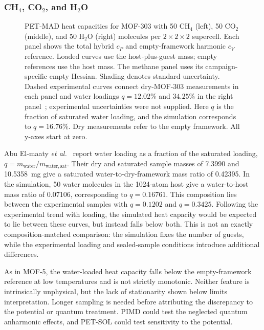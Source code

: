 \documentclass[12pt,a4paper]{article}
\numberwithin{equation}{section}
\begin{document}
\subsubsection{CH$_4$, CO$_2$, and H$_2$O}
\label{sec:mof303-guests-results}

\begin{figure}[htbp]
  \centering
  \mofthreethreetotals
  \caption{PET-MAD heat capacities for MOF-303 with 50 CH$_4$ (left),
  50 CO$_2$ (middle), and 50 H$_2$O (right) molecules per
  $2\times2\times2$ supercell. Each panel shows the total hybrid $c_P$
  and empty-framework harmonic $c_V$ reference. Loaded curves use the
  host-plus-guest mass; empty references use the host mass. The methane
  panel uses its campaign-specific empty Hessian. Shading denotes standard
  uncertainty. Dashed experimental curves connect dry-MOF-303 measurements
  in each panel and water loadings $q=12.02\%$ and $34.25\%$ in the right
  panel~\cite{abuelmaaty2025}; experimental uncertainties were not supplied.
  Here $q$ is the fraction of saturated water loading, and the simulation
  corresponds to $q=16.76\%$. Dry measurements refer to the empty framework.
  All y-axes start at zero.}
  \label{fig:results-mof303-additional}
  \label{fig:results-mof303-ch4}
  \label{fig:results-mof303-co2}
  \label{fig:results-mof303-h2o}
\end{figure}

Abu El-maaty \emph{et al.}~\cite{abuelmaaty2025} report water loading as
a fraction of the saturated loading,
$q=m_{\mathrm{water}}/m_{\mathrm{water,sat}}$. Their dry and saturated
sample masses of 7.3990 and \SI{10.5358}{mg} give a saturated
water-to-dry-framework mass ratio of 0.42395. In the simulation,
50 water molecules in the 1024-atom host give a water-to-host mass ratio
of 0.07106, corresponding to $q=0.16761$. This composition lies between
the experimental samples with $q=0.1202$ and $q=0.3425$.
Following the experimental trend with loading, the simulated heat capacity
would be expected to lie between these curves, but instead falls below both.
This is not an exactly composition-matched comparison: the simulation fixes
the number of guests, while the experimental loading and sealed-sample
conditions introduce additional differences.

As in MOF-5, the water-loaded heat capacity falls below the
empty-framework reference at low temperatures and is not strictly
monotonic. Neither feature is intrinsically unphysical, but the lack of
stationarity shown below limits interpretation. Longer sampling is needed
before attributing the discrepancy to the potential or quantum treatment.
PIMD could test the neglected quantum anharmonic effects, and PET-SOL
could test sensitivity to the potential.
\end{document}
